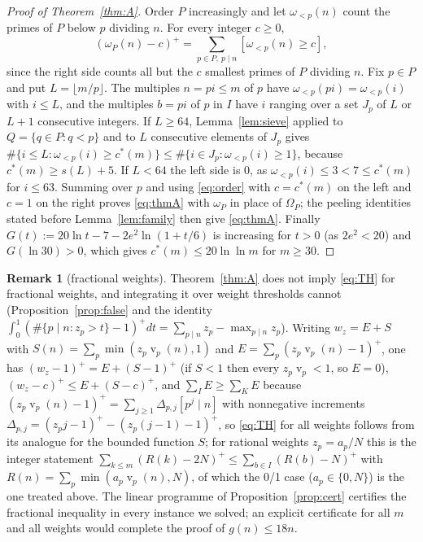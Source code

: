 \documentclass[11pt]{article}
\theoremstyle{definition}
\newtheorem{remark}[theorem]{Remark}
\DeclareMathOperator{\vp}{v}
\begin{document}
\begin{proof}[Proof of Theorem~\ref{thm:A}]
Order $P$ increasingly and let $\omega_{<p}(n)$ count the primes of $P$ below $p$ dividing $n$. For every integer $c\ge0$,
\begin{equation}\label{eq:order}
(\omega_P(n)-c)^+=\sum_{p\in P,\ p\mid n}[\omega_{<p}(n)\ge c],
\end{equation}
since the right side counts all but the $c$ smallest primes of $P$ dividing $n$. Fix $p\in P$ and put $L=\lfloor m/p\rfloor$.
The multiples $n=pi\le m$ of $p$ have $\omega_{<p}(pi)=\omega_{<p}(i)$ with $i\le L$, and the multiples $b=pi$ of $p$ in $I$
have $i$ ranging over a set $J_p$ of $L$ or $L+1$ consecutive integers. If $L\ge64$, Lemma~\ref{lem:sieve} applied to
$Q=\{q\in P:q<p\}$ and to $L$ consecutive elements of $J_p$ gives $\#\{i\le L:\omega_{<p}(i)\ge c^*(m)\}\le\#\{i\in J_p:\omega_{<p}(i)\ge1\}$,
because $c^*(m)\ge s(L)+5$. If $L<64$ the left side is $0$, as $\omega_{<p}(i)\le3<7\le c^*(m)$ for $i\le63$. Summing over
$p$ and using \eqref{eq:order} with $c=c^*(m)$ on the left and $c=1$ on the right proves \eqref{eq:thmA} with $\omega_P$ in
place of $\Omega_P$; the peeling identities stated before Lemma~\ref{lem:family} then give \eqref{eq:thmA}. Finally
$G(t):=20\ln t-7-2e^2\ln(1+t/6)$ is increasing for $t>0$ (as $2e^2<20$) and $G(\ln30)>0$, which gives $c^*(m)\le20\ln\ln m$
for $m\ge30$.
\end{proof}

\begin{remark}[fractional weights]
Theorem~\ref{thm:A} does not imply \eqref{eq:TH} for fractional weights, and integrating it over weight thresholds cannot
(Proposition~\ref{prop:false} and the identity $\int_0^1(\#\{p\mid n:z_p>t\}-1)^+dt=\sum_{p\mid n}z_p-\max_{p\mid n}z_p$). Writing
$w_z=E+S$ with $S(n)=\sum_p\min(z_p\vp_p(n),1)$ and $E=\sum_p(z_p\vp_p(n)-1)^+$, one has $(w_z-1)^+=E+(S-1)^+$ (if $S<1$ then every $z_p\vp_p<1$, so $E=0$),
$(w_z-c)^+\le E+(S-c)^+$, and $\sum_IE\ge\sum_KE$ because $(z_p\vp_p(n)-1)^+=\sum_{j\ge1}\Delta_{p,j}[p^j\mid n]$ with nonnegative
increments $\Delta_{p,j}=(z_pj-1)^+-(z_p(j-1)-1)^+$, so \eqref{eq:TH} for all weights follows from its analogue for the bounded
function $S$; for rational weights $z_p=a_p/N$ this is the integer statement $\sum_{k\le m}(R(k)-2N)^+\le\sum_{b\in I}(R(b)-N)^+$
with $R(n)=\sum_p\min(a_p\vp_p(n),N)$, of which the 0/1 case ($a_p\in\{0,N\}$) is the one treated above. The linear programme
of Proposition~\ref{prop:cert} certifies the fractional inequality in every instance we solved; an explicit certificate for all
$m$ and all weights would complete the proof of $g(n)\le18n$.
\end{remark}
\end{document}
